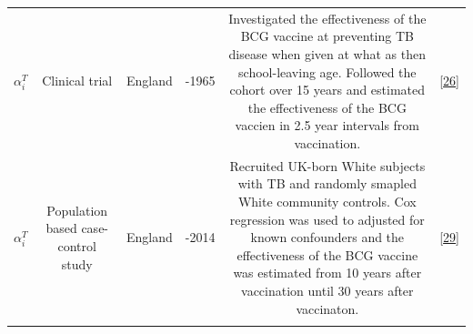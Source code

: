 \documentclass[11pt,twoside]{bristolthesis}
\begin{document}
\begin{longtable}[]{@{}cccccc@{}}
\begin{minipage}[t]{0.19\columnwidth}
  \(\alpha_i^T\)\strut
  \end{minipage} & \begin{minipage}[t]{0.09\columnwidth}\centering
  Clinical
  trial\strut
  \end{minipage} & \begin{minipage}[t]{0.07\columnwidth}\centering
  England\strut
  \end{minipage} & \begin{minipage}[t]{0.07\columnwidth}\centering
  1950-1965\strut
  \end{minipage} & \begin{minipage}[t]{0.31\columnwidth}\centering
  Investigated the effectiveness of the BCG vaccine
  at preventing TB disease when given at what as
  then school-leaving age. Followed the cohort over
  15 years and estimated the effectiveness of the
  BCG vaccien in 2.5 year intervals from
  vaccination.\strut
  \end{minipage} & \begin{minipage}[t]{0.10\columnwidth}\centering
  {[}\protect\hyperlink{ref-Hart1972}{26}{]}\strut
  \end{minipage}\tabularnewline
  \begin{minipage}[t]{0.19\columnwidth}\centering
  \(\alpha_i^T\)\strut
  \end{minipage} & \begin{minipage}[t]{0.09\columnwidth}\centering
  Population
  based
  case-control
  study\strut
  \end{minipage} & \begin{minipage}[t]{0.07\columnwidth}\centering
  England\strut
  \end{minipage} & \begin{minipage}[t]{0.07\columnwidth}\centering
  2002-2014\strut
  \end{minipage} & \begin{minipage}[t]{0.31\columnwidth}\centering
  Recruited UK-born White subjects with TB and
  randomly smapled White community controls. Cox
  regression was used to adjusted for known
  confounders and the effectiveness of the BCG
  vaccine was estimated from 10 years after
  vaccination until 30 years after vaccinaton.\strut
  \end{minipage} & \begin{minipage}[t]{0.10\columnwidth}\centering
  {[}\protect\hyperlink{ref-Mangtani2017}{29}{]}\strut
  \end{minipage}\tabularnewline
  \begin{minipage}[t]{0.19\columnwidth}\centering

\end{minipage}
\end{longtable}
\end{document}
